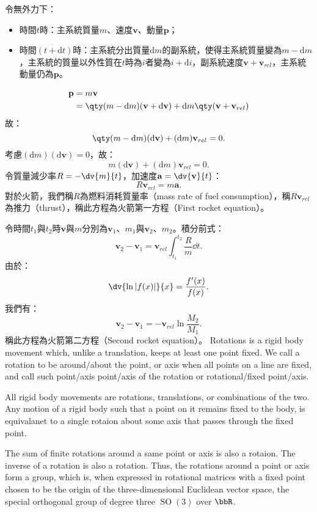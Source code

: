 \documentclass[a4paper,12pt]{article}
\begin{document}
令無外力下：
\begin{itemize}
\item 時間$t$時：主系統質量$m$、速度$\mathbf{v}$、動量$\mathbf{p}$；
\item 時間$(t+\mathrm{d}t)$時：主系統分出質量$\mathrm{d}m$的副系統，使得主系統質量變為$m-\mathrm{d}m$，主系統的質量以外性質在$t$時為$i$者變為$i+\mathrm{d}i$，副系統速度$\mathbf{v}+\mathbf{v}_{rel}$，主系統動量仍為$\mathbf{p}$。
\end{itemize}
\[\begin{aligned}
\mathbf{p}&=m\mathbf{v} \\
&=\qty(m-\mathrm{d}m)(\mathbf{v}+\mathrm{d}\mathbf{v})+\mathrm{d}m\qty(\mathbf{v}+\mathbf{v}_{rel})
\end{aligned}\]
故：
\[\qty(m-\mathrm{d}m)(\mathrm{d}\mathbf{v})+(\mathrm{d}m)\mathbf{v}_{rel}=0.\]
考慮$(\mathrm{d}m)(\mathrm{d}\mathbf{v})=0$，故：
\[m(\mathrm{d}\mathbf{v})+(\mathrm{d}m)\mathbf{v}_{rel}=0.\]
令質量減少率$R=-\dv{m}{t}$，加速度$\mathbf{a}=\dv{\mathbf{v}}{t}$：
\[R\mathbf{v}_{rel}=m\mathbf{a}.\]
對於火箭，我們稱$R$為燃料消耗質量率（mass rate of fuel consumption），稱$R\mathbf{v}_{rel}$為推力（thrust），稱此方程為火箭第一方程（First rocket equation）。

令時間$t_1$與$t_2$時$\mathbf{v}$與$m$分別為$\mathbf{v}_1$、$m_1$與$\mathbf{v}_2$、$m_2$。積分前式：
\[\mathbf{v}_2-\mathbf{v}_1=\mathbf{v}_{rel}\int_{t_1}^{t_2}\frac{R}{m}\dd{t}.\]
由於：
\[\dv{\ln|f(x)|}{x}=\frac{f'(x)}{f(x)}.\]
我們有：
\[\mathbf{v}_2-\mathbf{v}_1=-\mathbf{v}_{rel}\ln\frac{M_2}{M_1}.\]
稱此方程為火箭第二方程（Second rocket equation）。
Rotations is a rigid body movement which, unlike a translation, keeps at least one point fixed. We call a rotation to be around/about the point, or axis when all points on a line are fixed, and call such point/axis point/axis of the rotation or rotational/fixed point/axis.

All rigid body movements are rotations, translations, or combinations of the two.
Any motion of a rigid body such that a point on it remains fixed to the body, is equivalanet to a single rotaion about some axis that passes through the fixed point.

The sum of finite rotations around a same point or axis is also a rotaion. The inverse of a rotation is also a rotation. Thus, the rotations around a point or axis form a group, which is, when expressed in rotational matrices with a fixed point chosen to be the origin of the three-dimensional Euclidean vector space, the special orthogonal group of degree three $\operatorname{SO}(3)$ over $\bbR$.
\end{document}
